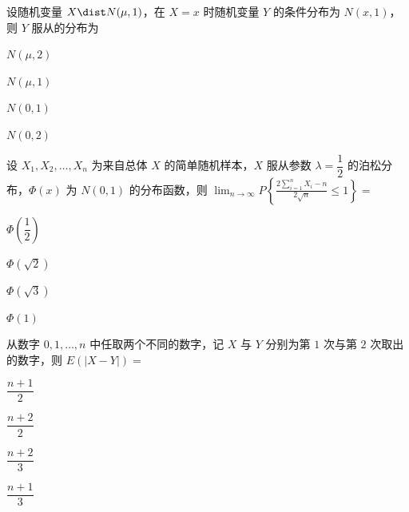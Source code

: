 \begin{question}[index=8]
设随机变量 $X\dist N(\mu,1)$，在 $X=x$ 时随机变量 $Y$ 的条件分布为 $N(x,1)$，则 $Y$ 服从的分布为
\begin{choices}[columns=4]
\item $N(\mu,2)$
\item $N(\mu,1)$
\item $N(0,1)$
\item $N(0,2)$
\end{choices}
\end{question}
\QuestionBreak

\begin{question}[index=9]
设 $X_1,X_2,\ldots,X_n$ 为来自总体 $X$ 的简单随机样本，$X$ 服从参数 $\lambda=\dfrac12$ 的泊松分布，$\Phi(x)$ 为 $N(0,1)$ 的分布函数，则 $\displaystyle\lim_{n\to\infty}P\left\{\frac{2\sum_{i=1}^nX_i-n}{2\sqrt n}\le1\right\}=$
\begin{choices}[columns=2]
\item $\Phi\!\left(\dfrac12\right)$
\item $\Phi(\sqrt2)$
\item $\Phi(\sqrt3)$
\item $\Phi(1)$
\end{choices}
\end{question}
\QuestionBreak

\begin{question}[index=10]
从数字 $0,1,\ldots,n$ 中任取两个不同的数字，记 $X$ 与 $Y$ 分别为第 $1$ 次与第 $2$ 次取出的数字，则 $E(|X-Y|)=$
\begin{choices}[columns=4]
\item $\dfrac{n+1}2$
\item $\dfrac{n+2}2$
\item $\dfrac{n+2}3$
\item $\dfrac{n+1}3$
\end{choices}
\end{question}
